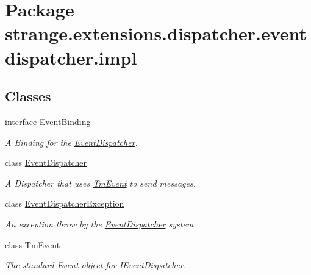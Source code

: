\hypertarget{namespacestrange_1_1extensions_1_1dispatcher_1_1eventdispatcher_1_1impl}{\section{Package strange.\-extensions.\-dispatcher.\-eventdispatcher.\-impl}
\label{namespacestrange_1_1extensions_1_1dispatcher_1_1eventdispatcher_1_1impl}
}
\subsection*{Classes}
\begin{DoxyCompactItemize}
\item 
interface \hyperlink{classstrange_1_1extensions_1_1dispatcher_1_1eventdispatcher_1_1impl_1_1_event_binding}{Event\-Binding}
\begin{DoxyCompactList}\small\item\em A Binding for the \hyperlink{classstrange_1_1extensions_1_1dispatcher_1_1eventdispatcher_1_1impl_1_1_event_dispatcher}{Event\-Dispatcher}. \end{DoxyCompactList}\item 
class \hyperlink{classstrange_1_1extensions_1_1dispatcher_1_1eventdispatcher_1_1impl_1_1_event_dispatcher}{Event\-Dispatcher}
\begin{DoxyCompactList}\small\item\em A Dispatcher that uses \hyperlink{classstrange_1_1extensions_1_1dispatcher_1_1eventdispatcher_1_1impl_1_1_tm_event}{Tm\-Event} to send messages. \end{DoxyCompactList}\item 
class \hyperlink{classstrange_1_1extensions_1_1dispatcher_1_1eventdispatcher_1_1impl_1_1_event_dispatcher_exception}{Event\-Dispatcher\-Exception}
\begin{DoxyCompactList}\small\item\em An exception throw by the \hyperlink{classstrange_1_1extensions_1_1dispatcher_1_1eventdispatcher_1_1impl_1_1_event_dispatcher}{Event\-Dispatcher} system. \end{DoxyCompactList}\item 
class \hyperlink{classstrange_1_1extensions_1_1dispatcher_1_1eventdispatcher_1_1impl_1_1_tm_event}{Tm\-Event}
\begin{DoxyCompactList}\small\item\em The standard Event object for I\-Event\-Dispatcher. \end{DoxyCompactList}\end{DoxyCompactItemize}
